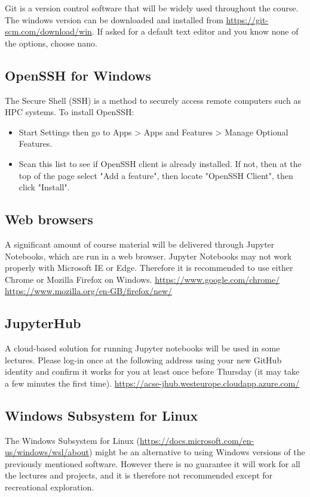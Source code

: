 \documentclass[11pt]{article}
\begin{document}
Git is a version control software that will be widely used throughout the course. 
The windows version can be downloaded and installed from \url{https://git-scm.com/download/win}. 
If asked for a default text editor and you know none of the options, choose nano.

\subsection{OpenSSH for Windows}

The Secure Shell (SSH) is a method to securely access remote computers such as HPC systems. To install OpenSSH:
\begin{itemize}
\item Start Settings then go to Apps > Apps and Features > Manage Optional Features.
\item Scan this list to see if OpenSSH client is already installed. If not, then at the top of the page select "Add a feature", then locate "OpenSSH Client", then click "Install".
\end{itemize}

\subsection{Web browsers}

A significant amount of course material will be delivered through Jupyter Notebooks, which are run in a web browser. 
Jupyter Notebooks may not work properly with Microsoft IE or Edge. 
Therefore it is recommended to use either Chrome or Mozilla Firefox on Windows.  
\url{https://www.google.com/chrome/}
\url{https://www.mozilla.org/en-GB/firefox/new/} 

\subsection{JupyterHub}

A cloud-based solution for running Jupyter notebooks will be used in some lectures. Please log-in once at the following address using your new GitHub identity and confirm it works for you at least once before Thursday (it may take a few minutes the first time).
\url{https://acse-jhub.westeurope.cloudapp.azure.com/}


\subsection{Windows Subsystem for Linux}

The Windows Subsystem for Linux (\url{https://docs.microsoft.com/en-us/windows/wsl/about}) might be an alternative to using Windows versions of the previously mentioned software. 
However there is no guarantee it will work for all the lectures and projects, and it is therefore not recommended except for recreational exploration.
\end{document}
